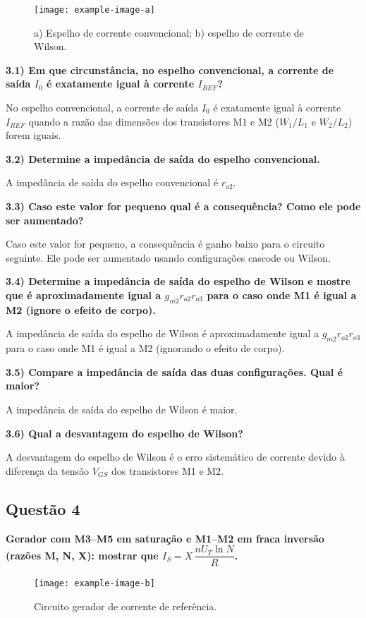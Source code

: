 \documentclass[12pt,a4paper]{article}
\begin{document}
\begin{figure}[H]
    \centering
    \texttt{[image: example-image-a]}
    \caption{a) Espelho de corrente convencional; b) espelho de corrente de Wilson.}
    \label{fig:espelhos_corrente}
\end{figure}

\t\textbf{3.1) Em que circunstância, no espelho convencional, a corrente de saída $I_0$ é exatamente igual à corrente $I_{REF}$?}

No espelho convencional, a corrente de saída $I_0$ é exatamente igual à corrente $I_{REF}$ quando a razão das dimensões dos transistores M1 e M2 ($W_1/L_1$ e $W_2/L_2$) forem iguais.

\t\textbf{3.2) Determine a impedância de saída do espelho convencional.}

A impedância de saída do espelho convencional é $r_{o2}$.

\t\textbf{3.3) Caso este valor for pequeno qual é a consequência? Como ele pode ser aumentado?}

Caso este valor for pequeno, a consequência é ganho baixo para o circuito seguinte. Ele pode ser aumentado usando configurações cascode ou Wilson.

\t\textbf{3.4) Determine a impedância de saída do espelho de Wilson e mostre que é aproximadamente igual a $g_{m2} r_{o2} r_{o3}$ para o caso onde M1 é igual a M2 (ignore o efeito de corpo).}

A impedância de saída do espelho de Wilson é aproximadamente igual a $g_{m2} r_{o2} r_{o3}$ para o caso onde M1 é igual a M2 (ignorando o efeito de corpo).

\t\textbf{3.5) Compare a impedância de saída das duas configurações. Qual é maior?}

A impedância de saída do espelho de Wilson é maior.

\t\textbf{3.6) Qual a desvantagem do espelho de Wilson?}

A desvantagem do espelho de Wilson é o erro sistemático de corrente devido à diferença da tensão $V_{GS}$ dos transistores M1 e M2.

\subsection*{Questão 4}
	\textbf{Gerador com M3–M5 em saturação e M1–M2 em fraca inversão (razões M, N, X): mostrar que $I_S = X\,\dfrac{n U_T \ln N}{R}$.}

\begin{figure}[H]
    \centering
    \texttt{[image: example-image-b]}
    \caption{Circuito gerador de corrente de referência.}
    \label{fig:gerador_corrente}
\end{figure}
\end{document}
